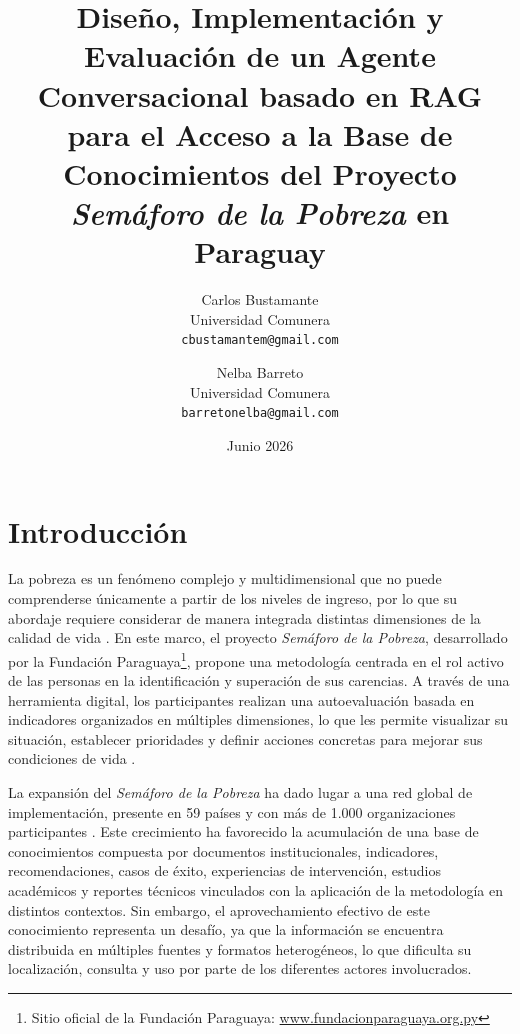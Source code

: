 \documentclass{article}
\begin{document}
\hyphenation{}

\title{Diseño, Implementación y Evaluación de un Agente Conversacional basado en RAG para el Acceso a la Base de Conocimientos del Proyecto \textit{Semáforo de la Pobreza} en Paraguay}

\author{
  Carlos Bustamante \\
  Universidad Comunera \\
  \texttt{cbustamantem@gmail.com}
  \and
  Nelba Barreto \\
  Universidad Comunera \\
  \texttt{barretonelba@gmail.com}
}

\date{Junio 2026}
\maketitle

\section{Introducción}\label{sec:introduccion}

La pobreza es un fenómeno complejo y multidimensional que no puede comprenderse únicamente a partir de los niveles de ingreso, por lo que su abordaje requiere considerar de manera integrada distintas dimensiones de la calidad de vida \cite{BrochureEspanolDigital}. En este marco, el proyecto \textit{Semáforo de la Pobreza}, desarrollado por la Fundación Paraguaya\footnote{Sitio oficial de la Fundación Paraguaya: \href{https://www.fundacionparaguaya.org.py}{www.fundacionparaguaya.org.py} }, propone una metodología centrada en el rol activo de las personas en la identificación y superación de sus carencias. A través de una herramienta digital, los participantes realizan una autoevaluación basada en indicadores organizados en múltiples dimensiones, lo que les permite visualizar su situación, establecer prioridades y definir acciones concretas para mejorar sus condiciones de vida \cite{ManualSemaforo2023}.

La expansión del \textit{Semáforo de la Pobreza} ha dado lugar a una red global de implementación, presente en 59 países y con más de 1.000 organizaciones participantes \cite{BrochureEspanolDigital}. Este crecimiento ha favorecido la acumulación de una base de conocimientos compuesta por documentos institucionales, indicadores, recomendaciones, casos de éxito, experiencias de intervención, estudios académicos y reportes técnicos vinculados con la aplicación de la metodología en distintos contextos. Sin embargo, el aprovechamiento efectivo de este conocimiento representa un desafío, ya que la información se encuentra distribuida en múltiples fuentes y formatos heterogéneos, lo que dificulta su localización, consulta y uso por parte de los diferentes actores involucrados.
\end{document}
